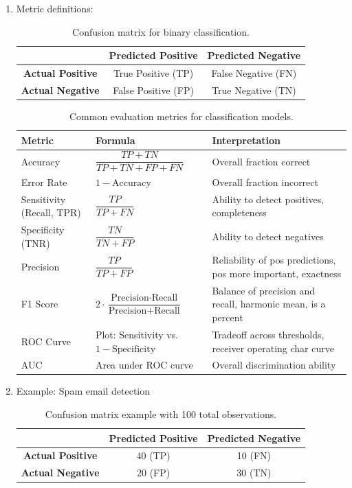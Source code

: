 \documentclass{article}
\begin{document}
\begin{enumerate}
\item Metric definitions:

\begin{table}[h!]
\centering
\begin{tabular}{c|c|c}
 & \textbf{Predicted Positive} & \textbf{Predicted Negative} \\
\hline
\textbf{Actual Positive} & True Positive (TP) & False Negative (FN) \\
\textbf{Actual Negative} & False Positive (FP) & True Negative (TN) \\
\end{tabular}
\caption{Confusion matrix for binary classification.}
\end{table}

\begin{table}[h!]
\centering
\begin{tabular}{l l l}
\hline
\textbf{Metric} & \textbf{Formula} & \textbf{Interpretation} \\
\hline
Accuracy & $\dfrac{TP + TN}{TP + TN + FP + FN}$ & Overall fraction correct \\
Error Rate & $1 - \text{Accuracy}$ & Overall fraction incorrect \\
Sensitivity (Recall, TPR) & $\dfrac{TP}{TP + FN}$ & Ability to detect positives, completeness \\
Specificity (TNR) & $\dfrac{TN}{TN + FP}$ & Ability to detect negatives \\
Precision & $\dfrac{TP}{TP + FP}$ & Reliability of pos predictions, pos more important, exactness \\
F1 Score & $2 \cdot \dfrac{\text{Precision}\cdot\text{Recall}}{\text{Precision}+\text{Recall}}$ & Balance of precision and recall, harmonic mean, is a percent \\
ROC Curve & Plot: Sensitivity vs. $1 - \text{Specificity}$ & Tradeoff across thresholds, receiver operating char curve \\
AUC & Area under ROC curve & Overall discrimination ability \\
\hline
\end{tabular}
\caption{Common evaluation metrics for classification models.}
\end{table}

\item Example: Spam email detection

\begin{table}[h!]
\centering
\begin{tabular}{c|c|c}
 & \textbf{Predicted Positive} & \textbf{Predicted Negative} \\
\hline
\textbf{Actual Positive} & 40 (TP) & 10 (FN) \\
\textbf{Actual Negative} & 20 (FP) & 30 (TN) \\
\end{tabular}
\caption{Confusion matrix example with 100 total observations.}
\end{table}


\end{enumerate}
\end{document}
